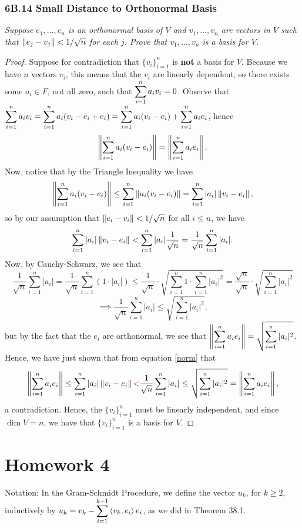 \documentclass{article}
\begin{document}
\subsubsection*{6B.14 Small Distance to Orthonormal Basis}
\textit{Suppose $e_1, \ldots, e_n$ is an orthonormal basis of $V$ and $v_1, \ldots, v_n$ are vectors in $V$ such that $\left\Vert e_j - v_j\right\Vert < 1/\sqrt n$ for each $j$. Prove that $v_1, \ldots, v_n$ is a basis for $V$.}
\begin{proof}
Suppose for contradiction that $\{v_i\}_{i=1}^n$ is \textbf{not} a basis for $V$. Because we have $n$ vectors $v_i$, this means that the $v_i$ are linearly dependent, so there exists some $a_i\in F$, not all zero, such that $\displaystyle\sum_{i=1}^n a_iv_i = 0$. Observe that $\displaystyle\sum_{i=1}^n a_iv_i = \sum_{i=1}^n a_i(v_i - e_i + e_i) = \sum_{i=1}^n a_i(v_i - e_i) + \sum_{i=1}^n a_ie_i$, hence
\begin{equation}\label{norm}
\left\Vert \sum_{i=1}^n a_i(v_i-e_i)\right\Vert = \left\Vert \sum_{i=1}^n a_ie_i\right\Vert.
\end{equation}
Now, notice that by the Triangle Inequality we have
$$\left\Vert \sum_{i=1}^n a_i(v_i-e_i)\right\Vert \leq \sum_{i=1}^n \left\Vert a_i(v_i-e_i)\right\Vert = \sum_{i=1}^n |a_i|\left\Vert v_i-e_i\right\Vert,$$
so by our assumption that $\left\Vert e_i-v_i\right\Vert < 1/\sqrt n$ for all $i\leq n$, we have
$$\sum_{i=1}^n |a_i|\left\Vert v_i-e_i\right\Vert < \sum_{i=1}^n |a_i| \frac 1{\sqrt n} = \frac 1{\sqrt n}\sum_{i=1}^n |a_i|.$$
Now, by Cauchy-Schwarz, we see that
$$\frac 1{\sqrt n}\sum_{i=1}^n |a_i| = \frac 1{\sqrt n}\sum_{i=1}^n (1\cdot |a_i|) \leq \frac 1{\sqrt n}\cdot\sqrt{\sum_{i=1}^n 1 \cdot \sum_{i=1}^n |a_i|^2} = \frac{\sqrt n}{\sqrt n}\cdot \sqrt{\sum_{i=1}^n |a_i|^2}$$
$$\implies\frac 1{\sqrt n}\sum_{i=1}^n |a_i| \leq \sqrt{\sum_{i=1}^n |a_i|^2},$$
but by the fact that the $e_i$ are orthonormal, we see that $\displaystyle\left\Vert \sum_{i=1}^n a_ie_i\right\Vert = \sqrt{\sum_{i=1}^n |a_i|^2}$. Hence, we have just shown that from equation \eqref{norm} that
$$\left\Vert \sum_{i=1}^n a_ie_i\right\Vert \leq \sum_{i=1}^n |a_i|\left\Vert v_i-e_i\right\Vert \textcolor{red}< \textcolor{black}{\frac 1{\sqrt n}\sum_{i=1}^n |a_i|\leq \sqrt{\sum_{i=1}^n |a_i|^2} = \left\Vert \sum_{i=1}^n a_ie_i\right\Vert,}$$
a contradiction. Hence, the $\{v_i\}_{i=1}^n$ must be linearly independent, and since $\dim V = n$, we have that $\{v_i\}_{i=1}^n$ is a basis for $V$.
\end{proof}
\newpage
\section*{Homework 4}
Notation: In the Gram-Schmidt Procedure, we define the vector $u_k$, for $k\geq 2$, inductively by $\displaystyle u_k = v_k - \sum_{i=1}^{k-1} \left\langle v_k, e_i\right\rangle e_i$, as we did in Theorem 38.1.
\end{document}

